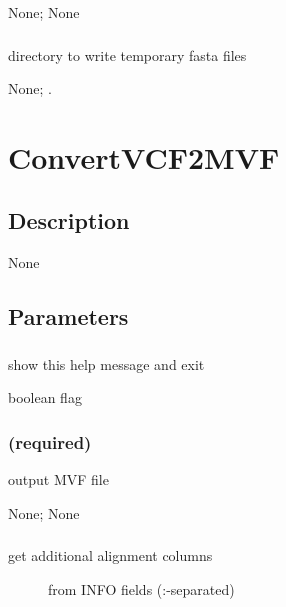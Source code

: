 \documentclass[letterpaper,11pt,english]{sphinxmanual}
\begin{document}
 None;  None


\subsubsection{}
\label{\detokenize{prog_desc:id32}}
 directory to write temporary fasta files

 None;  .


\section{ConvertVCF2MVF}
\label{\detokenize{prog_desc:convertvcf2mvf}}

\subsection{Description}
\label{\detokenize{prog_desc:id33}}
None


\subsection{Parameters}
\label{\detokenize{prog_desc:id34}}

\subsubsection{}
\label{\detokenize{prog_desc:id35}}
 show this help message and exit

 boolean flag


\subsubsection{ (required)}
\label{\detokenize{prog_desc:id36}}
 output MVF file

 None;  None


\subsubsection{}
\label{\detokenize{prog_desc:alleles-from-allelesfrom}}\begin{description}
\item[{ get additional alignment columns}] \leavevmode
from INFO fields (:-separated)

\end{description}
\end{document}
